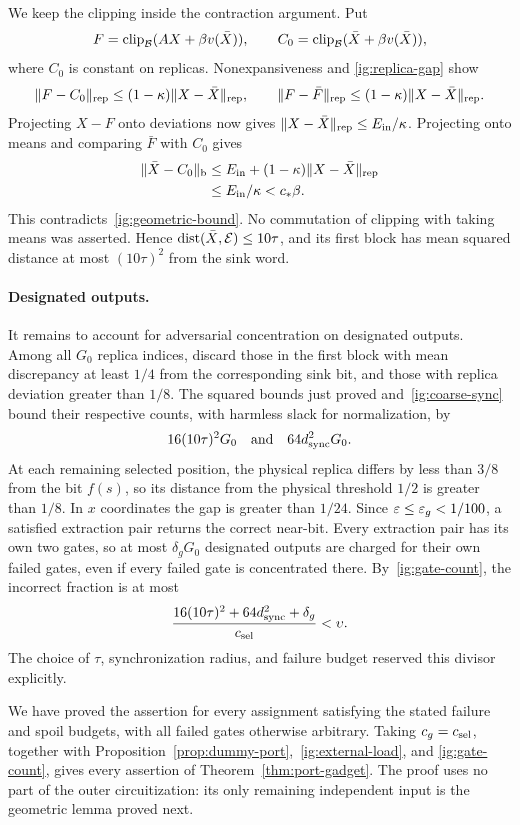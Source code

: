 We keep the clipping inside the contraction argument. Put
\[
 F=\operatorname{clip}_{\mathcal B}(AX+\beta v(\bar X)),\qquad
 C_0=\operatorname{clip}_{\mathcal B}(\bar X+\beta v(\bar X)),
\]
where $C_0$ is constant on replicas. Nonexpansiveness and
\eqref{ig:replica-gap} show
\[
 \|F-C_0\|_{\rm rep}\le(1-\kappa)\|X-\bar X\|_{\rm rep},
 \qquad
 \|F-\bar F\|_{\rm rep}\le(1-\kappa)\|X-\bar X\|_{\rm rep}.
\]
Projecting $X-F$ onto deviations now gives
$\|X-\bar X\|_{\rm rep}\le E_{\rm in}/\kappa$.
Projecting onto means and comparing $\bar F$ with $C_0$ gives
\begin{align*}
 \|\bar X-C_0\|_{\rm b}
 &\le E_{\rm in}+(1-\kappa)\|X-\bar X\|_{\rm rep}\\
 &\le E_{\rm in}/\kappa<c_*\beta.
\end{align*}
This contradicts~\eqref{ig:geometric-bound}. No commutation of clipping
with taking means was asserted. Hence
$\operatorname{dist}(\bar X,\mathcal E)\le10\tau$, and its first block has
mean squared distance at most $(10\tau)^2$ from the sink word.

\paragraph{Designated outputs.}
It remains to account for adversarial concentration on designated
outputs. Among all $G_0$ replica indices, discard those in the first
block with mean discrepancy at least $1/4$ from the corresponding sink
bit, and those with replica deviation greater than $1/8$. The squared
bounds just proved and~\eqref{ig:coarse-sync} bound their respective
counts, with harmless slack for normalization, by
\[
 16(10\tau)^2G_0\quad\text{and}\quad64d_{\rm sync}^2G_0.
\]
At each remaining selected position, the physical replica differs by
less than $3/8$ from the bit $f(s)$, so its distance from the physical
threshold $1/2$ is greater than $1/8$. In $x$ coordinates the gap is
greater than $1/24$. Since $\varepsilon\le\varepsilon_g<1/100$, a satisfied
extraction pair returns the correct near-bit. Every extraction pair has
its own two gates, so at most $\delta_gG_0$ designated outputs are
charged for their own failed gates, even if every failed gate is
concentrated there. By~\eqref{ig:gate-count}, the incorrect fraction is
at most
\begin{equation}\label{ig:extraction-loss}
 \frac{16(10\tau)^2+64d_{\rm sync}^2+\delta_g}{c_{\rm sel}}
 <\upsilon.
\end{equation}
The choice of $\tau$, synchronization radius, and failure budget reserved
this divisor explicitly.

We have proved the assertion for every assignment satisfying the stated
failure and spoil budgets, with all failed gates otherwise arbitrary.
Taking $c_g=c_{\rm sel}$, together with
Proposition~\ref{prop:dummy-port},~\eqref{ig:external-load}, and
\eqref{ig:gate-count}, gives every assertion of
Theorem~\ref{thm:port-gadget}. The proof uses no part of the outer
circuitization: its only remaining independent input is the geometric
lemma proved next.
